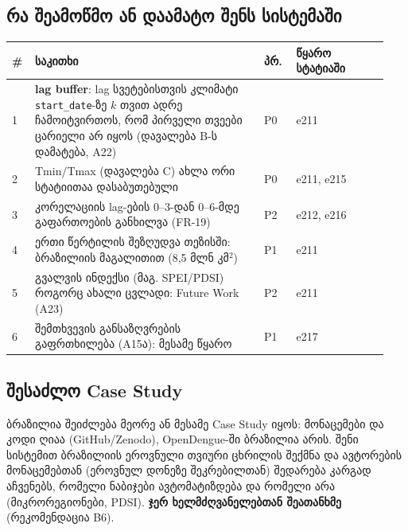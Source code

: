 \documentclass[11pt,a4paper]{article}
\begin{document}
\subsection*{რა შეამოწმო ან დაამატო შენს სისტემაში}
\begin{longtable}{@{}p{0.05\linewidth}p{0.58\linewidth}p{0.08\linewidth}p{0.23\linewidth}@{}}
\toprule
\textbf{\#} & \textbf{საკითხი} & \textbf{პრ.} & \textbf{წყარო სტატიაში}\\
\midrule
1 & \textbf{lag buffer}: lag სვეტებისთვის კლიმატი \texttt{start\_date}-ზე $k$ თვით ადრე ჩამოიტვირთოს, რომ პირველი თვეები ცარიელი არ იყოს (დავალება B-ს დამატება, A22) & P0 & e211\\
2 & Tmin/Tmax (დავალება C) ახლა ორი სტატიითაა დასაბუთებული & P0 & e211, e215\\
3 & კორელაციის lag-ების 0--3-დან 0--6-მდე გაფართოების განხილვა (FR-19) & P2 & e212, e216\\
4 & ერთი წერტილის შეზღუდვა თეზისში: ბრაზილიის მაგალითით (8,5 მლნ კმ$^2$) & P1 & e211\\
5 & გვალვის ინდექსი (მაგ. SPEI/PDSI) როგორც ახალი ცვლადი: Future Work (A23) & P2 & e211\\
6 & შემთხვევის განსაზღვრების გაფრთხილება (A15ა): მესამე წყარო & P1 & e217\\
\bottomrule
\end{longtable}

\subsection*{შესაძლო Case Study}
ბრაზილია შეიძლება მეორე ან მესამე Case Study იყოს: მონაცემები და კოდი ღიაა (GitHub/Zenodo), OpenDengue-ში ბრაზილია არის.
შენი სისტემით ბრაზილიის ეროვნული თვიური ცხრილის შექმნა და ავტორების მონაცემებთან (ეროვნულ დონეზე შეკრებილთან) შედარება
კარგად აჩვენებს, რომელი ნაბიჯები ავტომატიზდება და რომელი არა (მიკრორეგიონები, PDSI). \textbf{ჯერ ხელმძღვანელებთან შეათანხმე}
(რეკომენდაცია B6).
\end{document}
